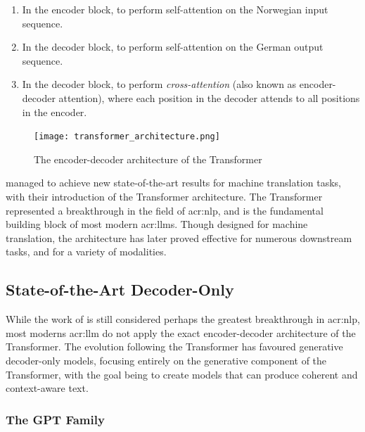\begin{enumerate}
    \item In the encoder block, to perform self-attention on the Norwegian input sequence.
    \item In the decoder block, to perform self-attention on the German output sequence.
    \item In the decoder block, to perform \textit{cross-attention} (also known as encoder-decoder attention), where each position in the decoder attends to all positions in the encoder.
\end{enumerate}

\begin{figure}
    \centering
    \texttt{[image: transformer\_architecture.png]}
    \caption[The encoder-decoder architecture of the Transformer]{The encoder-decoder architecture of the Transformer \citep[5]{vaswaniAttentionAllYou2017}}
    \label{fig:transformer-architecture}
\end{figure}

\citeauthor{vaswaniAttentionAllYou2017} managed to achieve new state-of-the-art results for machine translation tasks, with their introduction of the Transformer architecture. The Transformer represented a breakthrough in the field of \gls{acr:nlp}, and is the fundamental building block of most modern \glspl{acr:llm}. Though designed for machine translation, the architecture has later proved effective for numerous downstream tasks, and for a variety of modalities.


\subsection[State-of-the-Art Decoder-Only LLMs]{State-of-the-Art Decoder-Only }
\label{subsec:sota-decoder-only-llms}

While the work of \cite{vaswaniAttentionAllYou2017} is still considered perhaps the greatest breakthrough in \gls{acr:nlp}, most moderns \acrshort{acr:llm} do not apply the exact encoder-decoder architecture of the Transformer. The evolution following the Transformer has favoured generative decoder-only models, focusing entirely on the generative component of the Transformer, with the goal being to create models that can produce coherent and context-aware text.

\subsubsection{The GPT Family}
\label{subusubsec:gpt}

